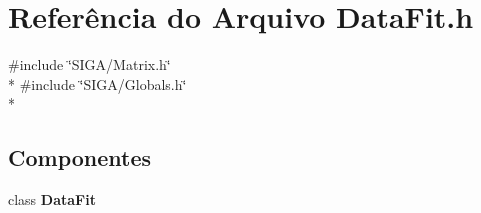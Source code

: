 \section{Referência do Arquivo Data\+Fit.\+h}
\label{_data_fit_8h}
{\ttfamily \#include \char`\"{}S\+I\+G\+A/\+Matrix.\+h\char`\"{}}\\*
{\ttfamily \#include \char`\"{}S\+I\+G\+A/\+Globals.\+h\char`\"{}}\\*
\subsection*{Componentes}
\begin{DoxyCompactItemize}
\item 
class {\bf Data\+Fit}
\end{DoxyCompactItemize}
